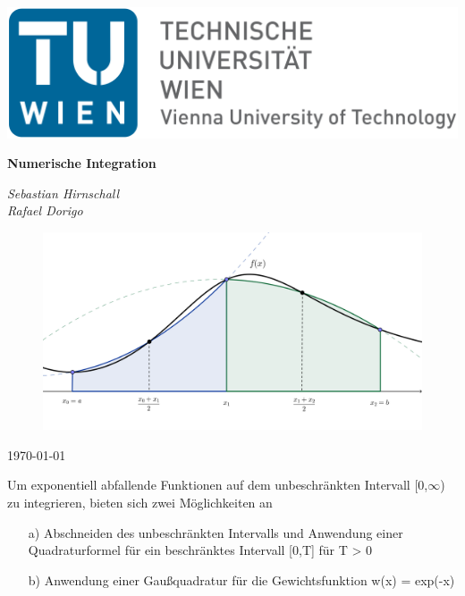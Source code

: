 \documentclass[12pt,a4paper]{scrartcl}
\author{Sebastian Hirnschall}
\date{\today}
\numberwithin{equation}{section}
\numberwithin{myalgctr}{section}
\numberwithin{mytheoremctr}{section}
\numberwithin{mykorollarctr}{section}
\numberwithin{mylemmactr}{section}
\numberwithin{mybeispielctr}{section}
\begin{document}
	\begin{titlepage}
		\begin{flushleft}
				\includegraphics[width=.4\linewidth]{tuwien.png}
		\end{flushleft}	
		\centering
		
		
		\vspace{5cm}
		{\huge\bfseries Numerische Integration\par}
		\vspace{2cm}
		{\Large\itshape Sebastian Hirnschall\\Rafael Dorigo\par}
		\vspace{2cm}
		\begin{figure}[!h]
			\vspace{0cm}
			\centering
			\includegraphics[width=.6\linewidth]{./titlepage.png}
		\end{figure}
		
		\vfill
		
		{\large \today\par}
	\end{titlepage}
	\restoregeometry
	
	\thispagestyle{firststyle}
	
	\newpage
	
	
	\tableofcontents
	\thispagestyle{general}
	\newpage

	\noindent
	Um exponentiell abfallende Funktionen auf dem unbeschränkten Intervall [0,$\infty$) zu integrieren, bieten sich zwei Möglichkeiten an
	\begin{itemize}		
	\item[a)] 	Abschneiden des unbeschränkten Intervalls und Anwendung einer Quadraturformel für ein beschränktes Intervall [0,T] für T > 0
	\item[b)] 	Anwendung einer Gaußquadratur für die Gewichtsfunktion w(x) = exp(-x) 
	\end{itemize}
\end{document}
